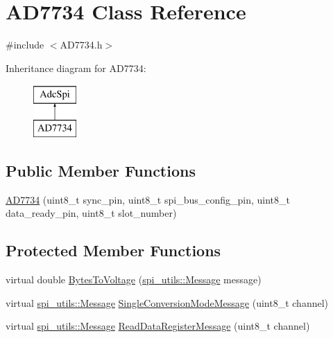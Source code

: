 \hypertarget{classAD7734}{}\section{A\+D7734 Class Reference}
\label{classAD7734}


{\ttfamily \#include $<$A\+D7734.\+h$>$}

Inheritance diagram for A\+D7734\+:\begin{figure}[H]
\begin{center}
\leavevmode
\includegraphics[height=2.000000cm]{classAD7734}
\end{center}
\end{figure}
\subsection*{Public Member Functions}
\begin{DoxyCompactItemize}
\item 
\mbox{\hyperlink{classAD7734_a2bf3cea4357919fda364b8121cd6af4f}{A\+D7734}} (uint8\+\_\+t sync\+\_\+pin, uint8\+\_\+t spi\+\_\+bus\+\_\+config\+\_\+pin, uint8\+\_\+t data\+\_\+ready\+\_\+pin, uint8\+\_\+t slot\+\_\+number)
\end{DoxyCompactItemize}
\subsection*{Protected Member Functions}
\begin{DoxyCompactItemize}
\item 
virtual double \mbox{\hyperlink{classAD7734_aa13b49141e69a45508998004a208afdc}{Bytes\+To\+Voltage}} (\mbox{\hyperlink{structspi__utils_1_1Message}{spi\+\_\+utils\+::\+Message}} message)
\item 
virtual \mbox{\hyperlink{structspi__utils_1_1Message}{spi\+\_\+utils\+::\+Message}} \mbox{\hyperlink{classAD7734_af677fbfbae0ec1c78b453ceb4a6736ec}{Single\+Conversion\+Mode\+Message}} (uint8\+\_\+t channel)
\item 
virtual \mbox{\hyperlink{structspi__utils_1_1Message}{spi\+\_\+utils\+::\+Message}} \mbox{\hyperlink{classAD7734_a6fa5e7c2bd8cde50dccb328d36f12516}{Read\+Data\+Register\+Message}} (uint8\+\_\+t channel)
\end{DoxyCompactItemize}


